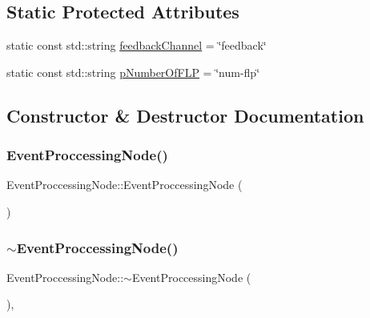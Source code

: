 \subsection*{Static Protected Attributes}
\begin{DoxyCompactItemize}
\item 
static const std\+::string \hyperlink{classEventProccessingNode_aff8819ba7eccef81b99760fb5c60179a}{feedback\+Channel} = \char`\"{}feedback\char`\"{}
\item 
static const std\+::string \hyperlink{classEventProccessingNode_ad895b2abb002854259ed05ea29e13595}{p\+Number\+Of\+F\+LP} = \char`\"{}num-\/flp\char`\"{}
\end{DoxyCompactItemize}


\subsection{Constructor \& Destructor Documentation}
\mbox{\label{classEventProccessingNode_a6312a3edf6a8baa7dee9f65c48090fa2}} 
\subsubsection{\texorpdfstring{Event\+Proccessing\+Node()}{EventProccessingNode()}}
{\footnotesize\ttfamily Event\+Proccessing\+Node\+::\+Event\+Proccessing\+Node (\begin{DoxyParamCaption}{ }\end{DoxyParamCaption})}

\mbox{\label{classEventProccessingNode_aecdaccecfbcb665833a206b7aa8e86c5}} 
\subsubsection{\texorpdfstring{$\sim$\+Event\+Proccessing\+Node()}{~EventProccessingNode()}}
{\footnotesize\ttfamily Event\+Proccessing\+Node\+::$\sim$\+Event\+Proccessing\+Node (\begin{DoxyParamCaption}{ }\end{DoxyParamCaption})\hspace{0.3cm}{\ttfamily [override]}, {\ttfamily [default]}}



